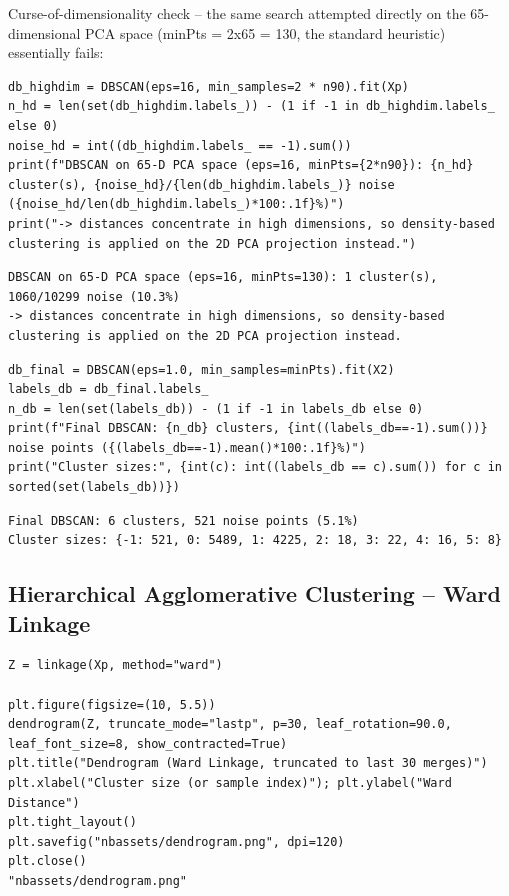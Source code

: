 \documentclass[12pt,a4paper]{article}
\begin{document}
Curse-of-dimensionality check -- the same search attempted directly on the
65-dimensional PCA space (minPts = 2x65 = 130, the standard heuristic)
essentially fails:

\begin{verbatim}
db_highdim = DBSCAN(eps=16, min_samples=2 * n90).fit(Xp)
n_hd = len(set(db_highdim.labels_)) - (1 if -1 in db_highdim.labels_ else 0)
noise_hd = int((db_highdim.labels_ == -1).sum())
print(f"DBSCAN on 65-D PCA space (eps=16, minPts={2*n90}): {n_hd} cluster(s), {noise_hd}/{len(db_highdim.labels_)} noise ({noise_hd/len(db_highdim.labels_)*100:.1f}%)")
print("-> distances concentrate in high dimensions, so density-based clustering is applied on the 2D PCA projection instead.")
\end{verbatim}

\begin{verbatim}
DBSCAN on 65-D PCA space (eps=16, minPts=130): 1 cluster(s), 1060/10299 noise (10.3%)
-> distances concentrate in high dimensions, so density-based clustering is applied on the 2D PCA projection instead.
\end{verbatim}


\begin{verbatim}
db_final = DBSCAN(eps=1.0, min_samples=minPts).fit(X2)
labels_db = db_final.labels_
n_db = len(set(labels_db)) - (1 if -1 in labels_db else 0)
print(f"Final DBSCAN: {n_db} clusters, {int((labels_db==-1).sum())} noise points ({(labels_db==-1).mean()*100:.1f}%)")
print("Cluster sizes:", {int(c): int((labels_db == c).sum()) for c in sorted(set(labels_db))})
\end{verbatim}

\begin{verbatim}
Final DBSCAN: 6 clusters, 521 noise points (5.1%)
Cluster sizes: {-1: 521, 0: 5489, 1: 4225, 2: 18, 3: 22, 4: 16, 5: 8}
\end{verbatim}

\subsection{Hierarchical Agglomerative Clustering -- Ward Linkage}
\label{sec:orgb9226ee}

\begin{verbatim}
Z = linkage(Xp, method="ward")

plt.figure(figsize=(10, 5.5))
dendrogram(Z, truncate_mode="lastp", p=30, leaf_rotation=90.0, leaf_font_size=8, show_contracted=True)
plt.title("Dendrogram (Ward Linkage, truncated to last 30 merges)")
plt.xlabel("Cluster size (or sample index)"); plt.ylabel("Ward Distance")
plt.tight_layout()
plt.savefig("nbassets/dendrogram.png", dpi=120)
plt.close()
"nbassets/dendrogram.png"
\end{verbatim}
\end{document}
